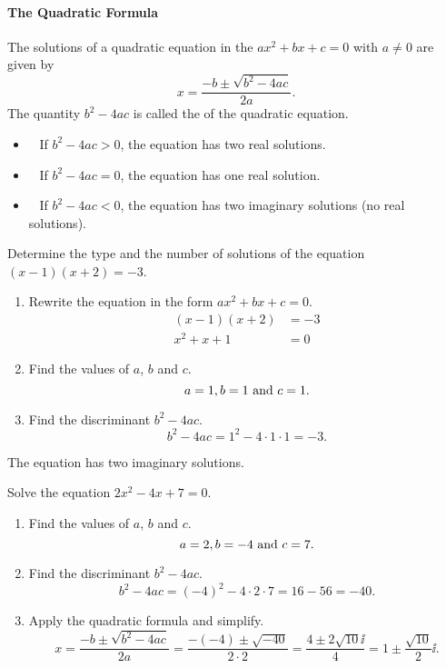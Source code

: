 
\paragraph*{The Quadratic Formula}
	The solutions of a quadratic equation in the  $ax^2+bx+c=0$ with $a\neq 0$ are given by 
	\[
		x=\dfrac{-b\pm\sqrt{b^2-4ac}}{2a}.
	\]
	The quantity $b^2-4ac$ is called the  of the quadratic equation.
	\begin{itemize}
		\item ~ If $b^2-4ac>0$, the equation has two real solutions.
		\item ~ If $b^2-4ac=0$, the equation has one real solution.
		\item ~ If $b^2-4ac<0$, the equation has two imaginary solutions (no real solutions).
	\end{itemize}

	\begin{example}
		Determine the type and the number of solutions of the equation $(x-1)(x+2)=-3$.
	\end{example}
	\begin{solution}\mbox{}\vspace{-0.25em}
		\begin{enumerate}[label={\textbf{\textup{Step \arabic*.}}~}]
			\item Rewrite the equation in the form $ax^2+bx+c=0$.
			      \[
				      \begin{split}
					      (x-1)(x+2)&=-3\\
					      x^2+x+1&=0
				      \end{split}
			      \]
			\item Find the values of $a$, $b$ and $c$.
			      \[
				      a=1, b=1 \textup{~and~} c=1.
			      \]
			\item Find the discriminant $b^2-4ac$.
			      \[
				      b^2-4ac=1^2-4\cdot 1\cdot 1=-3.
			      \]
		\end{enumerate}
		The equation has two imaginary solutions.
	\end{solution}

	\begin{example}
		Solve the equation $2x^2-4x+7=0$.
	\end{example}
	\begin{solution}\mbox{}\vspace{-0.25em}
		\begin{enumerate}[label={\textbf{\textup{Step \arabic*.}}~}]
			\item Find the values of $a$, $b$ and $c$.
			      \[
				      a=2, b=-4 \textup{~and~} c=7.
			      \]
			\item Find the discriminant $b^2-4ac$.
			      \[
				      b^2-4ac=(-4)^2-4\cdot 2\cdot 7=16-56=-40.
			      \]
			\item Apply the quadratic formula and simplify.
			      \[
				      x=\dfrac{-b\pm\sqrt{b^2-4ac}}{2a}=\dfrac{-(-4)\pm\sqrt{-40}}{2\cdot 2}=\frac{4\pm 2\sqrt{10} \ii}{4}=1\pm\frac{\sqrt{10}}{2}\ii.
			      \]
		\end{enumerate}
	\end{solution}

